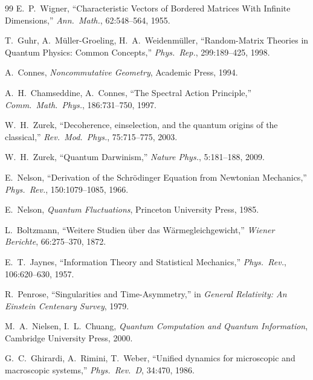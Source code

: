 \documentclass[12pt,a4paper]{article}
\theoremstyle{definition}
\theoremstyle{remark}
\begin{document}
\begin{thebibliography}{99}
 E.~P.~Wigner, ``Characteristic Vectors of Bordered
  Matrices With Infinite Dimensions,'' \emph{Ann.\ Math.}, 62:548--564, 1955.

 T.~Guhr, A.~M\"uller-Groeling, H.~A.~Weidenm\"uller,
  ``Random-Matrix Theories in Quantum Physics: Common Concepts,''
  \emph{Phys.\ Rep.}, 299:189--425, 1998.


 A.~Connes, \emph{Noncommutative Geometry}, Academic Press,
  1994.

 A.~H.~Chamseddine, A.~Connes, ``The Spectral
  Action Principle,'' \emph{Comm.\ Math.\ Phys.}, 186:731--750, 1997.


 W.~H.~Zurek, ``Decoherence, einselection, and the quantum
  origins of the classical,'' \emph{Rev.\ Mod.\ Phys.}, 75:715--775, 2003.

 W.~H.~Zurek, ``Quantum Darwinism,'' \emph{Nature Phys.},
  5:181--188, 2009.


 E.~Nelson, ``Derivation of the Schr\"odinger Equation from
  Newtonian Mechanics,'' \emph{Phys.\ Rev.}, 150:1079--1085, 1966.

 E.~Nelson, \emph{Quantum Fluctuations}, Princeton
  University Press, 1985.


 L.~Boltzmann, ``Weitere Studien \"uber das
  W\"armegleichgewicht,'' \emph{Wiener Berichte}, 66:275--370, 1872.

 E.~T.~Jaynes, ``Information Theory and Statistical
  Mechanics,'' \emph{Phys.\ Rev.}, 106:620--630, 1957.

 R.~Penrose, ``Singularities and Time-Asymmetry,'' in
  \emph{General Relativity: An Einstein Centenary Survey}, 1979.


 M.~A.~Nielsen, I.~L.~Chuang, \emph{Quantum Computation
  and Quantum Information}, Cambridge University Press, 2000.

 G.~C.~Ghirardi, A.~Rimini, T.~Weber, ``Unified dynamics for
  microscopic and macroscopic systems,'' \emph{Phys.\ Rev.\ D}, 34:470, 1986.


\end{thebibliography}
\end{document}
